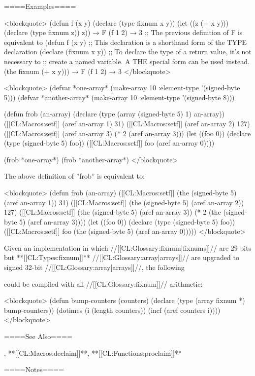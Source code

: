 ====Examples====

<blockquote> (defun f (x y) (declare (type fixnum x y)) (let ((z (+ x y))) (declare (type fixnum z)) z)) → F (f 1 2) → 3 ;; The previous definition of F is equivalent to (defun f (x y) ;; This declaration is a shorthand form of the TYPE declaration (declare (fixnum x y)) ;; To declare the type of a return value, it's not necessary to ;; create a named variable. A THE special form can be used instead. (the fixnum (+ x y))) → F (f 1 2) → 3 </blockquote>



<blockquote> (defvar *one-array* (make-array 10 :element-type '(signed-byte 5))) (defvar *another-array* (make-array 10 :element-type '(signed-byte 8)))

(defun frob (an-array) (declare (type (array (signed-byte 5) 1) an-array)) ([[CL:Macros:setf]] (aref an-array 1) 31) ([[CL:Macros:setf]] (aref an-array 2) 127) ([[CL:Macros:setf]] (aref an-array 3) (* 2 (aref an-array 3))) (let ((foo 0)) (declare (type (signed-byte 5) foo)) ([[CL:Macros:setf]] foo (aref an-array 0))))

(frob *one-array*) (frob *another-array*) </blockquote>

\medbreak

The above definition of ''frob'' is equivalent to:

<blockquote> (defun frob (an-array) ([[CL:Macros:setf]] (the (signed-byte 5) (aref an-array 1)) 31) ([[CL:Macros:setf]] (the (signed-byte 5) (aref an-array 2)) 127) ([[CL:Macros:setf]] (the (signed-byte 5) (aref an-array 3)) (* 2 (the (signed-byte 5) (aref an-array 3)))) (let ((foo 0)) (declare (type (signed-byte 5) foo)) ([[CL:Macros:setf]] foo (the (signed-byte 5) (aref an-array 0))))) </blockquote>

Given an implementation in which //[[CL:Glossary:fixnum|fixnums]]// are 29 bits but **[[CL:Types:fixnum]]** //[[CL:Glossary:array|arrays]]// are upgraded to signed 32-bit //[[CL:Glossary:array|arrays]]//, the following

could be compiled with all //[[CL:Glossary:fixnum]]// arithmetic:

<blockquote> (defun bump-counters (counters) (declare (type (array fixnum *) bump-counters)) (dotimes (i (length counters)) (incf (aref counters i)))) </blockquote>


====See Also====

, **[[CL:Macros:declaim]]**, **[[CL:Functions:proclaim]]**

====Notes====

